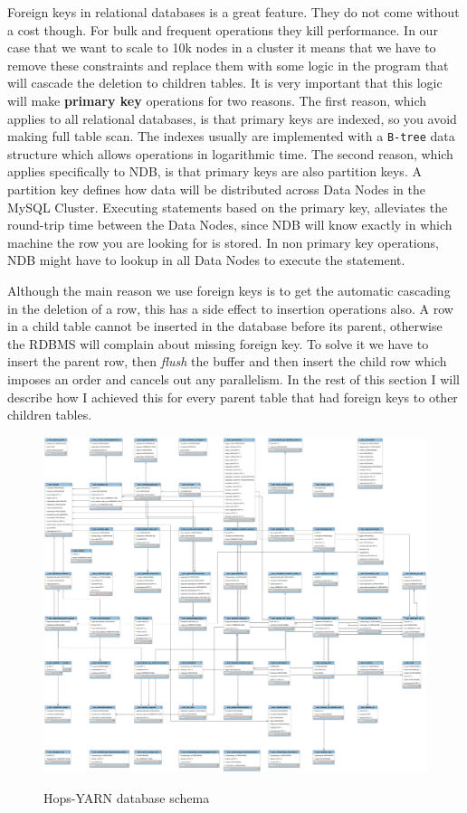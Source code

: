 Foreign keys in relational databases is a great feature. They do not
come without a cost though. For bulk and frequent operations they kill
performance. In our case that we want to scale to 10k nodes in a
cluster it means that we have to remove these constraints and replace
them with some logic in the program that will cascade the deletion to
children tables. It is very important that this logic will make
\textbf{primary key} operations for two reasons. The first reason, which
applies to all relational databases, is that primary keys are indexed,
so you avoid making full table scan. The indexes usually are
implemented with a \texttt{B-tree} data structure which allows
operations in logarithmic time. The second reason, which applies
specifically to NDB, is that primary keys are also partition keys. A
partition key defines how data will be distributed across Data Nodes
in the MySQL Cluster. Executing statements based on the primary key,
alleviates the round-trip time between the Data Nodes, since NDB will
know exactly in which machine the row you are looking for is
stored. In non primary key operations, NDB might have to lookup in all
Data Nodes to execute the statement.

Although the main reason we use foreign keys is to get the
automatic cascading in the deletion of a row, this has a side effect to
insertion operations also. A row in a child table cannot be inserted
in the database before its parent, otherwise the RDBMS will complain
about missing foreign key. To solve it we have to insert the parent
row, then \emph{flush} the buffer and then insert the child row which
imposes an order and cancels out any parallelism. In the rest of this section I will describe how I achieved
this for every parent table that had foreign keys to other children tables.

\begin{figure}
\centering
\includegraphics[scale=0.2, angle=90]{resources/images/Implementation/hops_yarn_ndb_schema_full.png}
\label{fig:impl_fk_yarn_schema}
\caption{Hops-YARN database schema}
\end{figure}


